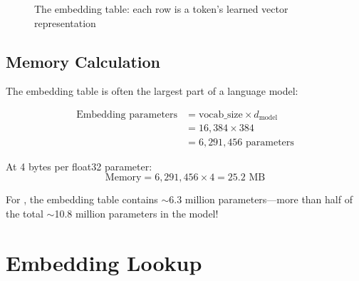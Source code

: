 \begin{figure}[H]
\centering
{}
\caption{The embedding table: each row is a token's learned vector representation}
\label{fig:embedding-table}
\end{figure}

\subsection{Memory Calculation}

The embedding table is often the largest part of a language model:

\begin{align*}
\text{Embedding parameters} &= \text{vocab\_size} \times d_{\text{model}} \\
&= 16,384 \times 384 \\
&= 6,291,456 \text{ parameters}
\end{align*}

At 4 bytes per float32 parameter:
\[
\text{Memory} = 6,291,456 \times 4 = 25.2 \text{ MB}
\]

\begin{keypoint}
For \TryLM, the embedding table contains $\sim$6.3 million parameters---more than half of the total $\sim$10.8 million parameters in the model!
\end{keypoint}

\section{Embedding Lookup}

